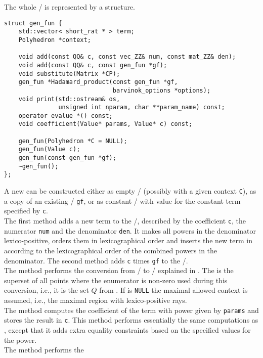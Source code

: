 The whole \rgf/ is represented by a 
structure.
\begin{verbatim}
struct gen_fun {
    std::vector< short_rat * > term;
    Polyhedron *context;

    void add(const QQ& c, const vec_ZZ& num, const mat_ZZ& den);
    void add(const QQ& c, const gen_fun *gf);
    void substitute(Matrix *CP);
    gen_fun *Hadamard_product(const gen_fun *gf,
                              barvinok_options *options);
    void print(std::ostream& os,
               unsigned int nparam, char **param_name) const;
    operator evalue *() const;
    void coefficient(Value* params, Value* c) const;

    gen_fun(Polyhedron *C = NULL);
    gen_fun(Value c);
    gen_fun(const gen_fun *gf);
    ~gen_fun();
};
\end{verbatim}
A new  can be constructed either as empty \rgf/ (possibly
with a given context \verb+C+), as a copy of an existing \rgf/ \verb+gf+, or as 
constant \rgf/ with value for the constant term specified by \verb+c+.
\\
The first  method adds a new term to the \rgf/,
described by the coefficient \verb+c+, the numerator \verb+num+ and the
denominator \verb+den+.
It makes all powers in the denominator lexico-positive,
orders them in lexicographical order and inserts the new
term in  according to the lexicographical
order of the combined powers in the denominator.
The second  method adds \verb+c+ times \verb+gf+
to the \rgf/.
\\
The method  performs
the conversion from \rgf/ to \psp/ explained in 
.
The   is the superset
of all points where the enumerator is non-zero used during this conversion,
i.e., it is the set $Q$ from .
If   is \verb+NULL+ the maximal
allowed context is assumed, i.e., the maximal
region with lexico-positive rays.  
\\
The method  computes the coefficient
of the term with power given by \verb+params+ and stores the result
in \verb+c+.
This method performs essentially the same computations as
, except that it adds extra
equality constraints based on the specified values for the power.
\\
The method  performs the
